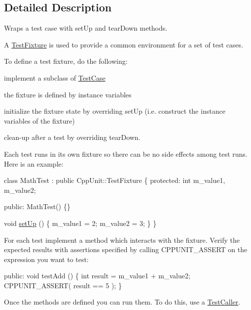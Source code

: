\subsection{Detailed Description}
Wraps a test case with set\-Up and tear\-Down methods.

A \hyperlink{class_test_fixture}{Test\-Fixture} is used to provide a common environment for a set of test cases. 

To define a test fixture, do the following\-:
\begin{DoxyItemize}
\item implement a subclass of \hyperlink{class_test_case}{Test\-Case}
\item the fixture is defined by instance variables
\item initialize the fixture state by overriding set\-Up (i.\-e. construct the instance variables of the fixture)
\item clean-\/up after a test by overriding tear\-Down.
\end{DoxyItemize}

Each test runs in its own fixture so there can be no side effects among test runs. Here is an example\-:


\begin{DoxyCode}
\textcolor{keyword}{class }MathTest : \textcolor{keyword}{public} CppUnit::TestFixture \{
\textcolor{keyword}{protected}:
  \textcolor{keywordtype}{int} m\_value1, m\_value2;

\textcolor{keyword}{public}:
  MathTest() \{\}

  \textcolor{keywordtype}{void} \hyperlink{class_test_fixture_a0e77590b14a3ec7f93fe02e5b89a242f}{setUp} () \{
    m\_value1 = 2;
    m\_value2 = 3;
  \}
\}
\end{DoxyCode}


For each test implement a method which interacts with the fixture. Verify the expected results with assertions specified by calling C\-P\-P\-U\-N\-I\-T\-\_\-\-A\-S\-S\-E\-R\-T on the expression you want to test\-:


\begin{DoxyCode}
\textcolor{keyword}{public}: 
  \textcolor{keywordtype}{void} testAdd () \{
    \textcolor{keywordtype}{int} result = m\_value1 + m\_value2;
    CPPUNIT\_ASSERT( result == 5 );
  \}
\end{DoxyCode}


Once the methods are defined you can run them. To do this, use a \hyperlink{class_test_caller}{Test\-Caller}.


